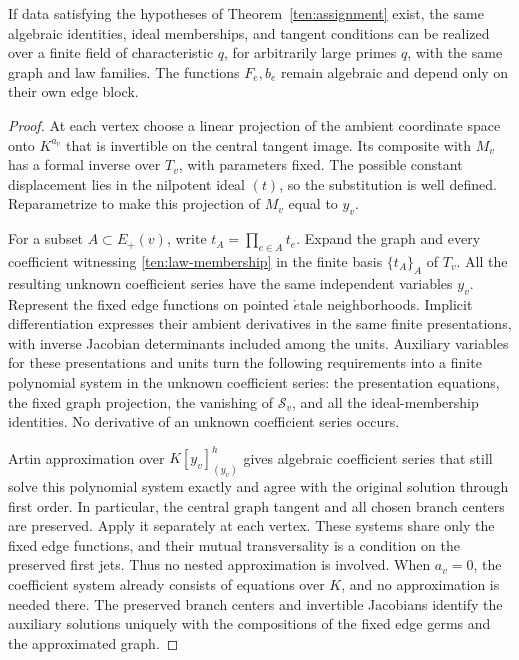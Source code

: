 \begin{lemma}\label{ten:specialization}
If data satisfying the hypotheses of Theorem~\ref{ten:assignment} exist,
the same algebraic identities, ideal memberships, and tangent conditions
can be realized over a finite field of characteristic \(q\), for arbitrarily
large primes \(q\), with the same graph and law families.  The functions
\(F_e,b_e\) remain algebraic and depend only on their own edge block.
\end{lemma}

\begin{proof}
At each vertex choose a linear projection of the ambient coordinate space
onto \(K^{a_v}\) that is invertible on the central tangent image.
Its composite with \(M_v\) has a formal inverse over \(T_v\), with
parameters fixed.  The possible constant displacement lies in the
nilpotent ideal \((t)\), so the substitution is well defined.  Reparametrize
to make this projection of \(M_v\) equal to \(y_v\).

For a subset \(A\subset E_+(v)\), write \(t_A=\prod_{e\in A}t_e\).
Expand the graph and every coefficient witnessing
\eqref{ten:law-membership} in the finite basis \(\{t_A\}_A\) of \(T_v\).
All the resulting unknown coefficient series have the same independent
variables \(y_v\).  Represent the fixed edge functions on pointed
\(\acute{e}\)tale neighborhoods.  Implicit differentiation expresses their
ambient derivatives in the same finite presentations, with inverse
Jacobian determinants included among the units.  Auxiliary variables for
these presentations and units turn the following requirements into a
finite polynomial system in the unknown coefficient series:
the presentation equations, the fixed graph projection, the vanishing of
\(\mathcal S_v\), and all the ideal-membership identities.  No derivative
of an unknown coefficient series occurs.

Artin approximation over \(K[y_v]_{(y_v)}^h\)
\cite[Theorem~1.10]{Artin1969} gives algebraic coefficient series that
still solve this polynomial system exactly and agree with the original
solution through first order.  In particular, the central graph tangent
and all chosen branch centers are preserved.
Apply it separately at each vertex.  These systems share only the fixed
edge functions, and their mutual transversality is a condition on the
preserved first jets.  Thus no nested approximation is involved.  When
\(a_v=0\), the coefficient system already consists of equations over
\(K\), and no approximation is needed there.
The preserved branch centers and invertible Jacobians identify the
auxiliary solutions uniquely with the compositions of the fixed edge
germs and the approximated graph.


\end{proof}
